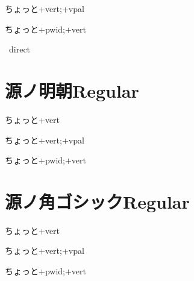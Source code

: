 \documentclass[tate,paper={297mm,210mm}]{jlreq}
\begin{document}
\hgrvpal\hbox{\tate\vrule ちょっと\vrule +vert;+vpal}

\hgrpwidvert\hbox{\tate\vrule ちょっと\vrule +pwid;+vert}

\hgrnone\hbox{\tate\vrule%
  \vrule direct}

\section*{源ノ明朝Regular}

\sernone\hbox{\tate\vrule ちょっと\vrule +vert}

\servpal\hbox{\tate\vrule ちょっと\vrule +vert;+vpal}

\serpwidvert\hbox{\tate\vrule ちょっと\vrule +pwid;+vert}

\section*{源ノ角ゴシックRegular}

\sarnone\hbox{\tate\vrule ちょっと\vrule +vert}

\sarvpal\hbox{\tate\vrule ちょっと\vrule +vert;+vpal}

\sarpwidvert\hbox{\tate\vrule ちょっと\vrule +pwid;+vert}
\end{document}
